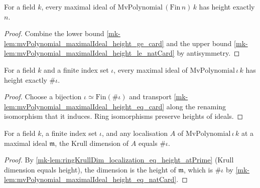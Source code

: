 \begin{lemma}
  \label{mk-lem:mvPolynomial_maximalIdeal_height_eq_card}
  For a field \(k\), every maximal ideal of
  \(\mathrm{MvPolynomial}\,(\mathrm{Fin}\,n)\,k\) has height exactly \(n\).
\end{lemma}

\begin{proof}
  Combine the lower bound
  \ref{mk-lem:mvPolynomial_maximalIdeal_height_ge_card} and the upper bound
  \ref{mk-lem:mvPolynomial_maximalIdeal_height_le_natCard} by antisymmetry.
\end{proof}

\begin{lemma}
  \label{mk-lem:mvPolynomial_maximalIdeal_height_eq_natCard}

  For a field \(k\) and a finite index set \(\iota\), every maximal ideal of
  \(\mathrm{MvPolynomial}\,\iota\,k\) has height exactly \(\#\iota\).
\end{lemma}

\begin{proof}
  Choose a bijection \(\iota \simeq \mathrm{Fin}(\#\iota)\) and transport
  \ref{mk-lem:mvPolynomial_maximalIdeal_height_eq_card} along the renaming isomorphism
  that it induces. Ring isomorphisms preserve heights of ideals.
\end{proof}

\begin{lemma}
  \label{mk-lem:ringKrullDim_localization_atMaximal_mvPolynomial}

  For a field \(k\), a finite index set \(\iota\), and any localisation \(A\) of
  \(\mathrm{MvPolynomial}\,\iota\,k\) at a maximal ideal \(\mathfrak m\), the Krull
  dimension of \(A\) equals \(\#\iota\).
\end{lemma}

\begin{proof}
  By
  \ref{mk-lem:ringKrullDim_localization_eq_height_atPrime} (Krull dimension equals
  height), the dimension is the height of \(\mathfrak m\), which is
  \(\#\iota\) by \ref{mk-lem:mvPolynomial_maximalIdeal_height_eq_natCard}.
\end{proof}

